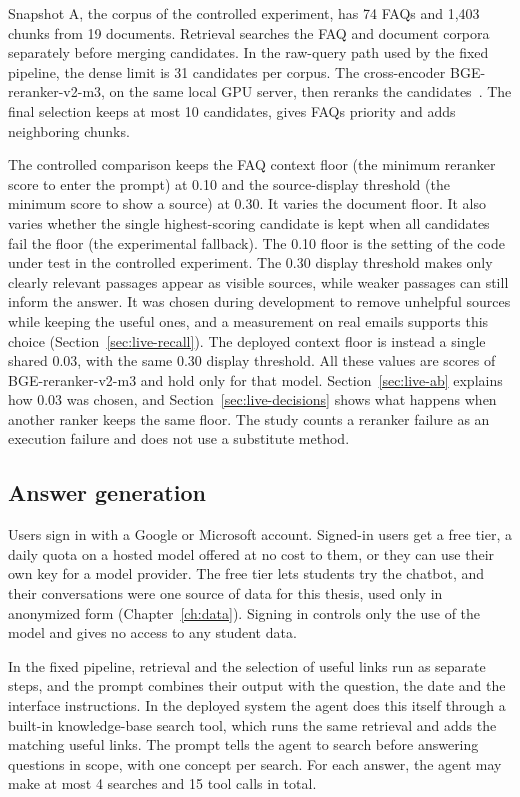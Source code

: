 Snapshot A, the corpus of the controlled experiment, has 74 FAQs and 1,403 chunks from 19 documents. Retrieval searches the FAQ and document corpora separately before merging candidates. In the raw-query path used by the fixed pipeline, the dense limit is 31 candidates per corpus. The cross-encoder BGE-reranker-v2-m3, on the same local GPU server, then reranks the candidates~\cite{baaiBgeRerankerV2M3}. The final selection keeps at most 10 candidates, gives FAQs priority and adds neighboring chunks.

The controlled comparison keeps the FAQ context floor (the minimum reranker score to enter the prompt) at 0.10 and the source-display threshold (the minimum score to show a source) at 0.30. It varies the document floor. It also varies whether the single highest-scoring candidate is kept when all candidates fail the floor (the experimental fallback). The 0.10 floor is the setting of the code under test in the controlled experiment. The 0.30 display threshold makes only clearly relevant passages appear as visible sources, while weaker passages can still inform the answer. It was chosen during development to remove unhelpful sources while keeping the useful ones, and a measurement on real emails supports this choice (Section~\ref{sec:live-recall}). The deployed context floor is instead a single shared 0.03, with the same 0.30 display threshold. All these values are scores of BGE-reranker-v2-m3 and hold only for that model. Section~\ref{sec:live-ab} explains how 0.03 was chosen, and Section~\ref{sec:live-decisions} shows what happens when another ranker keeps the same floor. The study counts a reranker failure as an execution failure and does not use a substitute method.

\subsection{Answer generation}

Users sign in with a Google or Microsoft account. Signed-in users get a free tier, a daily quota on a hosted model offered at no cost to them, or they can use their own key for a model provider. The free tier lets students try the chatbot, and their conversations were one source of data for this thesis, used only in anonymized form (Chapter~\ref{ch:data}). Signing in controls only the use of the model and gives no access to any student data.

In the fixed pipeline, retrieval and the selection of useful links run as separate steps, and the prompt combines their output with the question, the date and the interface instructions. In the deployed system the agent does this itself through a built-in knowledge-base search tool, which runs the same retrieval and adds the matching useful links. The prompt tells the agent to search before answering questions in scope, with one concept per search. For each answer, the agent may make at most 4 searches and 15 tool calls in total.

